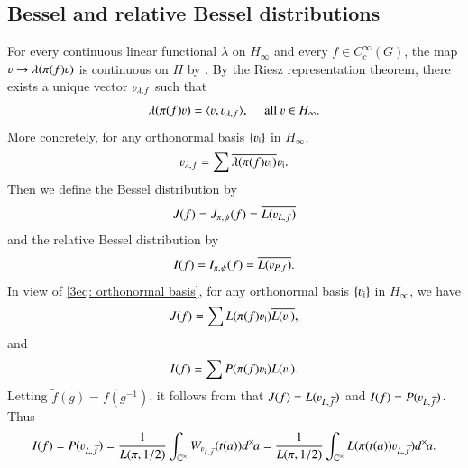 \documentclass{amsproc}
\newcommand{\BC}{{\mathbb {C}}} \newcommand{\BD}{{\mathbb {D}}}
\def\BCx{\BC^{\times}}
\def\shskip{\hskip 0.5 pt}
\def\dx{d^{\times} \hskip -1 pt}
\theoremstyle{plain}
\numberwithin{equation}{section}
\begin{document}
	
	\subsection{Bessel and relative Bessel distributions}
	For every continuous linear functional $\lambda $ on
	$H_\infty$ and every $f\in C_c^\infty(G)$, the map $\varv\to \lambda(\pi(f)\varv)$ is continuous on $H$ by  \cite[Proposition 3.2]{Shalika-MO}. By the Riesz representation theorem, there exists a unique
	vector $\varv_{\lambda,\shskip f}$ such that
	\begin{equation}\label{def: vector v l f}
	\lambda (\pi(f)\varv)=\langle \varv,\varv_{\lambda,\shskip f}\rangle , \hskip 10 pt \text{ all }  \varv\in H_\infty.
	\end{equation}
	More concretely, for any orthonormal basis $\{ \varv_{\mathfrak i} \}$ in $H_{\infty}$, 
	\begin{align}\label{3eq: orthonormal basis}
\varv_{\lambda,\shskip f} = \sum  \overline {\lambda (\pi(f)\varv_{\mathfrak i})} \shskip \varv_{\mathfrak i} .
	\end{align}
	Then we  define the Bessel distribution by
	\begin{equation}\label{def: J (f)}
	J(f)=J_{\pi,\shskip \psi}(f)=\overline{L(\varv_{L, \shskip f})}
	\end{equation}
	and the relative Bessel distribution by
	\begin{equation}\label{def: I(f)}
	I(f)=I_{\pi,\shskip \psi}(f)=\overline{L(\varv_{P, \shskip f}) }.
	\end{equation}
	In view of \eqref{3eq: orthonormal basis}, for any orthonormal basis $\{ \varv_{\mathfrak i} \}$ in $H_{\infty}$, we have
	\begin{align}\label{3eq: J(f)}
	J (f) = \sum  L (\pi(f)\varv_{\mathfrak i}) \overline {L (\varv_{\mathfrak i})}, 
	\end{align}
	and
	\begin{align}\label{3eq: I(f)}
	I (f) = \sum  P (\pi(f)\varv_{\mathfrak i}) \overline {L (\varv_{\mathfrak i})}.
	\end{align}
	Letting $\widetilde f(g)=f(g^{-1})$, it follows from \cite[Corollary 23.7]{BaruchMao-Real} that $J(f)=L(\varv_{L,\shskip\widetilde f})$ and $I(f)=P(\varv_{L,\shskip\widetilde f})$.%
	Thus
	\[
	I(f)=P(\varv_{L,\shskip\widetilde f})=\frac{1}{L(\pi,1/2)}\int_{\BCx}
	W_{\varv_{L,\shskip \widetilde f}}(t(a))\dx  a=\frac{1}{L(\pi,1/2)}\int_{\BCx}
	L(\pi(t(a))\varv_{L,\shskip \widetilde f})\dx a.
	\]
\end{document}
